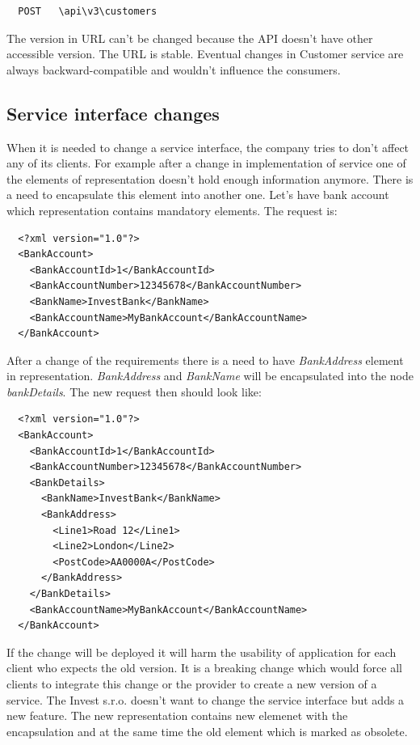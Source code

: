 \begin{lstlisting}
  POST   \api\v3\customers
\end{lstlisting}

The version in URL can't be changed because the API doesn't have other accessible version. The URL is stable. Eventual changes in Customer service are always backward-compatible and wouldn't influence the consumers. 

\subsection{Service interface changes}
When it is needed to change a service interface, the company tries to don't affect any of its clients. For example after a change in implementation of service one of the elements of representation doesn't hold enough information anymore. There is a need to encapsulate this element into another one. Let's have bank account which representation contains mandatory elements. The request is:

\begin{lstlisting}
  <?xml version="1.0"?>
  <BankAccount>
    <BankAccountId>1</BankAccountId>
    <BankAccountNumber>12345678</BankAccountNumber>
    <BankName>InvestBank</BankName>
    <BankAccountName>MyBankAccount</BankAccountName>
  </BankAccount>
\end{lstlisting}

After a change of the requirements there is a need to have \emph{BankAddress} element in representation. \emph{BankAddress} and \emph{BankName} will be encapsulated into the node \emph{bankDetails}. The new request then should look like:

\begin{lstlisting}
  <?xml version="1.0"?>
  <BankAccount>
    <BankAccountId>1</BankAccountId>
    <BankAccountNumber>12345678</BankAccountNumber>
    <BankDetails>
      <BankName>InvestBank</BankName>
      <BankAddress>
        <Line1>Road 12</Line1>
        <Line2>London</Line2>
        <PostCode>AA0000A</PostCode>
      </BankAddress>
    </BankDetails>
    <BankAccountName>MyBankAccount</BankAccountName>
  </BankAccount>
\end{lstlisting}

If the change will be deployed it will harm the usability of application for each client who expects the old version. It is a breaking change which would force all clients to integrate this change or the provider to create a new version of a service. The Invest s.r.o. doesn't want to change the service interface but adds a new feature. The new representation contains new elemenet with the encapsulation and at the same time the old element which is marked as obsolete.

